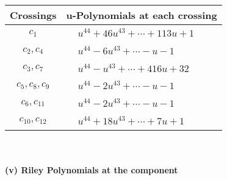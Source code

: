 \documentclass[1p]{elsarticle_modified}
\theoremstyle{definition}
\begin{document}
\begin{tabular}{m{50pt}|m{274pt}}
Crossings & \hspace{64pt}u-Polynomials at each crossing \\
\hline $$\begin{aligned}c_{1}\end{aligned}$$&$\begin{aligned}
&u^{44}+46 u^{43}+\cdots+113 u+1
\end{aligned}$\\
\hline $$\begin{aligned}c_{2},c_{4}\end{aligned}$$&$\begin{aligned}
&u^{44}-6 u^{43}+\cdots- u-1
\end{aligned}$\\
\hline $$\begin{aligned}c_{3},c_{7}\end{aligned}$$&$\begin{aligned}
&u^{44}- u^{43}+\cdots+416 u+32
\end{aligned}$\\
\hline $$\begin{aligned}c_{5},c_{8},c_{9}\end{aligned}$$&$\begin{aligned}
&u^{44}-2 u^{43}+\cdots- u-1
\end{aligned}$\\
\hline $$\begin{aligned}c_{6},c_{11}\end{aligned}$$&$\begin{aligned}
&u^{44}-2 u^{43}+\cdots- u-1
\end{aligned}$\\
\hline $$\begin{aligned}c_{10},c_{12}\end{aligned}$$&$\begin{aligned}
&u^{44}+18 u^{43}+\cdots+7 u+1
\end{aligned}$\\
\hline
\end{tabular}\\~\\
\newpage\renewcommand{\arraystretch}{1}
\flushleft \textbf{(v) Riley Polynomials at the component}\newline \\
\end{document}
